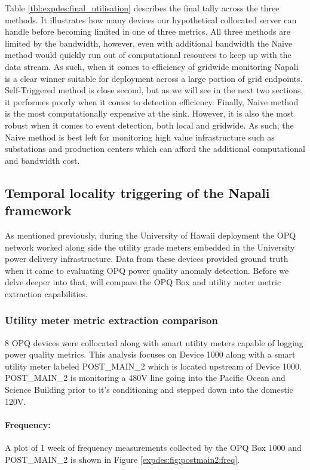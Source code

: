 Table \ref{tbl:expdes:final_utilisation} describes the final tally across the three methods.
It illustrates how many devices our hypothetical collocated server can handle before becoming limited in one of three metrics.
All three methods are limited by the bandwidth, however, even with additional bandwidth the Naive method would quickly run out of computational resources to keep up with the data stream.
As such, when it comes to efficiency of gridwide monitoring Napali is a clear winner suitable for deployment across a large portion of grid endpoints.
Self-Triggered method is close second, but as we will see in the next two sections, it performes poorly when it comes to detection efficiency.
Finally, Naive method is the most computationally expensive at the sink.
However, it is also the most robust when it comes to event detection, both local and gridwide.
As such, the Naive method is best left for monitoring high value infrastructure such as substations and production centers which can afford the additional computational and bandwidth cost.

\subsection{Temporal locality triggering of the Napali framework} \label{subsec:temporal-locality-triggering-of-the-napali-framework}
As mentioned previously, during the University of Hawaii deployment the OPQ network worked along side the utility grade meters embedded in the University power delivery infrastructure.
Data from these devices provided ground truth when it came to evaluating OPQ power quality anomaly detection.
Before we delve deeper into that, will compare the OPQ Box and utility meter metric extraction capabilities.

\subsubsection{Utility meter metric extraction comparison}

8 OPQ devices were collocated along with smart utility meters capable of logging power quality metrics.
This analysis focuses on Device 1000 along with a smart utility meter labeled POST\_MAIN\_2 which is located upstream of Device 1000.
POST\_MAIN\_2 is monitoring a 480V line going into the Pacific Ocean and Science Building prior to it's conditioning and stepped down into the domestic 120V.

\paragraph{Frequency:}
A plot of 1 week of frequency measurements collected by the OPQ Box 1000 and POST\_MAIN\_2 is shown in Figure \ref{expdes:fig:postmain2:freq}.

